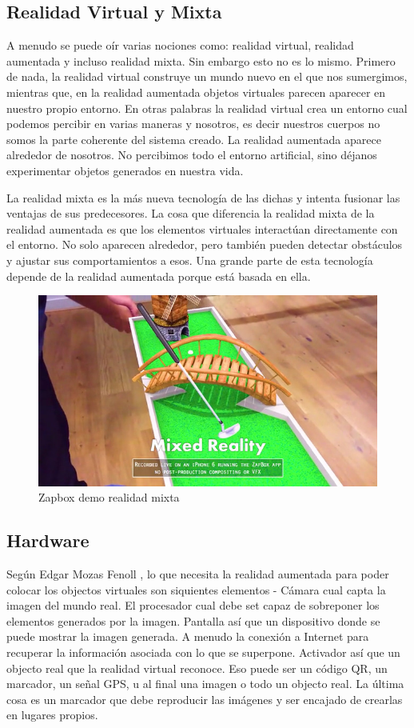 \documentclass[a4paper,11pt]{scrartcl}
\begin{document}
\subsection{Realidad Virtual y Mixta}
A menudo se puede oír varias nociones como: realidad virtual, realidad aumentada y incluso realidad mixta. Sin embargo esto no es lo mismo. Primero de nada, la realidad virtual construye un mundo nuevo en el que nos sumergimos, mientras que, en la realidad aumentada objetos virtuales parecen aparecer en nuestro propio entorno. En otras palabras la realidad virtual crea un entorno cual podemos percibir en varias maneras y nosotros, es decir nuestros cuerpos no somos la parte coherente del sistema creado. La realidad aumentada aparece alrededor de nosotros. No percibimos todo el entorno artificial, sino déjanos experimentar objetos generados en nuestra vida.
\par La realidad mixta es la más nueva tecnología de las dichas y intenta fusionar las ventajas de sus predecesores. La cosa que diferencia la realidad mixta de la realidad aumentada es que los elementos virtuales interactúan directamente con el entorno. No solo aparecen alrededor, pero también pueden detectar obstáculos y ajustar sus comportamientos a esos. Una grande parte de esta tecnología depende de la realidad aumentada porque está basada en ella.

\begin{figure}[h]
    \centering
    \includegraphics[width=0.7\linewidth]{mixedgolf}
    \caption{Zapbox demo realidad mixta \cite{imgmixedgolf}}
\end{figure}

\subsection{Hardware}
Según Edgar Mozas Fenoll \cite{hardware}, lo que necesita la realidad aumentada para poder colocar los objectos virtuales son siquientes elementos -
Cámara cual capta la imagen del mundo real. El procesador cual debe set capaz de sobreponer los elementos generados por la imagen. Pantalla así que un dispositivo donde se puede mostrar la imagen generada. A menudo la conexión a Internet para recuperar la información asociada con lo que se superpone. Activador así que un objecto real que la realidad virtual reconoce. Eso puede ser un código QR, un marcador, un señal GPS, u al final una imagen o todo un objecto real. La última cosa es un marcador que debe reproducir las imágenes y ser encajado de crearlas en lugares propios.
%
\end{document}
